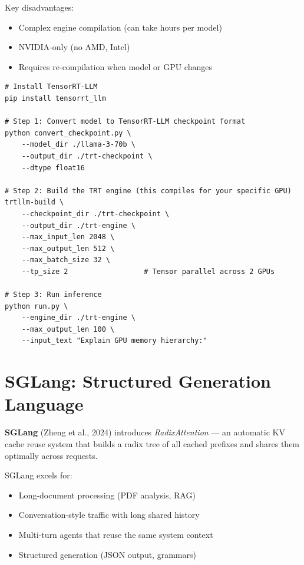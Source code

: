 \documentclass[11pt, twoside, openright]{book}
\newcommand{\keyterm}[1]{\textbf{\color{AccentOrange}#1}}
\begin{document}
Key disadvantages:
\begin{itemize}
  \item Complex engine compilation (can take hours per model)
  \item NVIDIA-only (no AMD, Intel)
  \item Requires re-compilation when model or GPU changes
\end{itemize}

\begin{lstlisting}[style=bashstyle, caption={Building and running a TensorRT-LLM engine}]
# Install TensorRT-LLM
pip install tensorrt_llm

# Step 1: Convert model to TensorRT-LLM checkpoint format
python convert_checkpoint.py \
    --model_dir ./llama-3-70b \
    --output_dir ./trt-checkpoint \
    --dtype float16

# Step 2: Build the TRT engine (this compiles for your specific GPU)
trtllm-build \
    --checkpoint_dir ./trt-checkpoint \
    --output_dir ./trt-engine \
    --max_input_len 2048 \
    --max_output_len 512 \
    --max_batch_size 32 \
    --tp_size 2                  # Tensor parallel across 2 GPUs

# Step 3: Run inference
python run.py \
    --engine_dir ./trt-engine \
    --max_output_len 100 \
    --input_text "Explain GPU memory hierarchy:"
\end{lstlisting}

\section{SGLang: Structured Generation Language}
\index{SGLang}

\keyterm{SGLang} (Zheng et al., 2024) introduces \textit{RadixAttention} --- an
automatic KV cache reuse system that builds a radix tree of all cached prefixes
and shares them optimally across requests.

SGLang excels for:
\begin{itemize}
  \item Long-document processing (PDF analysis, RAG)
  \item Conversation-style traffic with long shared history
  \item Multi-turn agents that reuse the same system context
  \item Structured generation (JSON output, grammars)
\end{itemize}
\end{document}
